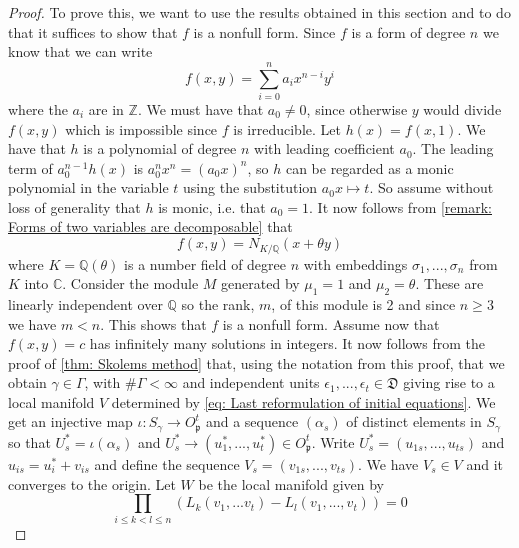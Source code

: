 \documentclass{article}
\newcommand{\mfrak}[1]{\mathfrak{#1}}
\newcommand{\mbb}[1]{\mathbb{#1}}
\numberwithin{equation}{section}
\begin{document}
\begin{proof}
    To prove this, we want to use the results obtained in this section and to do that it suffices to show that $f$ is a  nonfull form. Since $f$ is a form of degree $n$ we know that we can write
    $$f(x,y) = \sum_{i = 0}^n a_i x^{n-i} y^{i}$$
    where the $a_i$ are in $\mbb Z$. We must have that $a_0 \neq 0$, since otherwise $y$ would divide $f(x,y)$ which is impossible since $f$ is irreducible. Let $h(x) = f(x,1)$. We have that $h$ is a polynomial of degree $n$ with leading coefficient $a_0$. The leading term of $a_0^{n-1} h(x)$ is $a_0^nx^n = (a_0 x)^n$, so $h$ can be regarded as a monic polynomial in the variable $t$ using the substitution $a_0 x \mapsto t$. So assume without loss of generality that $h$ is monic, i.e. that $a_0 = 1$. It now follows from \cref{remark: Forms of two variables are decomposable} that
    \begin{equation}\label{eq: f(x,y) is a norm form}
        f(x, y) = N_{K / \mbb Q}(x + \theta y)
    \end{equation}
    where $K = \mbb Q(\theta)$ is a number field of degree $n$ with embeddings $\sigma_1, ..., \sigma_n$ from $K$ into $\mbb C$. Consider the module $M$ generated by $\mu_1 = 1$ and $\mu_2 = \theta$. These are linearly independent over $\mbb Q$ so the rank, $m$, of this module is 2 and since $n \geq 3$ we have $m < n$. This shows that $f$ is a nonfull form. Assume now that $f(x,y) = c$ has infinitely many solutions in integers. It now follows from the proof of \cref{thm: Skolems method} that, using the notation from this proof,  that we obtain $\gamma \in \Gamma$, with $\# \Gamma < \infty$ and independent units $\epsilon_1, ..., \epsilon_t \in \mfrak D$ giving rise to a local manifold $V$ determined by \cref{eq: Last reformulation of initial equations}. We get an injective map $\iota : S_\gamma \to O_\mfrak p^t$ and a sequence $(\alpha_s)$ of distinct elements in $S_\gamma$ so that $U^*_s = \iota(\alpha_s)$ and $U^*_s \to (u_1^*, ..., u_t^*) \in O_\mfrak p^t$. Write $U^*_s = (u_{1s}, ..., u_{ts})$ and $u_{is} = u_i^* + v_{is}$ and define the sequence $V_s = (v_{1s}, ..., v_{ts})$. We have $V_s \in V$ and it converges to the origin. Let $W$ be the local manifold given by
    $$\prod_{i \leq k < l \leq n} (L_k(v_1, ...v_t) - L_l(v_1, ...,  v_t)) = 0$$

\end{proof}
\end{document}
